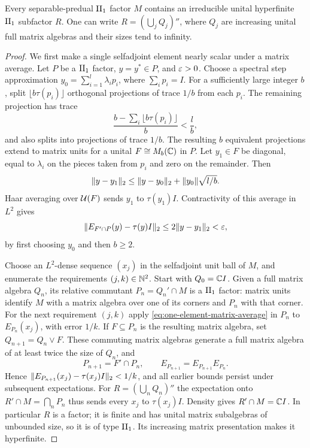 \begin{lemma}
\label{lem:irreducible-hyperfinite}
Every separable-predual $\mathrm{II}_1$ factor $M$ contains an irreducible unital
hyperfinite $\mathrm{II}_1$ subfactor $R$.  One can write
$R=(\bigcup_j Q_j)''$, where $Q_j$ are increasing unital full matrix
algebras and their sizes tend to infinity.
\end{lemma}
\begin{proof}
We first make a single selfadjoint element nearly scalar under a matrix
average.  Let $P$ be a $\mathrm{II}_1$ factor, $y=y^*\in P$, and $\varepsilon>0$.
Choose a spectral step approximation $y_0=\sum_{i=1}^l\lambda_i p_i$,
where $\sum_i p_i=I$.  For a sufficiently large integer $b$, split
$\lfloor b\tau(p_i)\rfloor$ orthogonal projections of trace $1/b$ from
each $p_i$.  The remaining projection has trace
\[
 \frac{b-\sum_i\lfloor b\tau(p_i)\rfloor}{b}<\frac lb,
\]
and also splits into projections of trace $1/b$.  The resulting $b$
equivalent projections extend to matrix units for a unital
$F\cong M_b(\mathbb C)$ in $P$.  Let $y_1\in F$ be diagonal, equal to
$\lambda_i$ on the pieces taken from $p_i$ and zero on the remainder.
Then
\[
 \lVert y-y_1\rVert_2\le\lVert y-y_0\rVert_2+\lVert y_0\rVert\sqrt{l/b}.
\]
Haar averaging over $\mathcal U(F)$ sends $y_1$ to $\tau(y_1)I$.  Contractivity
of this average in $L^2$ gives
\begin{equation}
 \lVert E_{F'\cap P}(y)-\tau(y)I\rVert_2
 \le2\lVert y-y_1\rVert_2<\varepsilon,
 \label{eq:one-element-matrix-average}
\end{equation}
by first choosing $y_0$ and then $b\ge2$.

Choose an $L^2$-dense sequence $(x_j)$ in the selfadjoint unit ball of
$M$, and enumerate the requirements $(j,k)\in\mathbb N^2$.  Start with
$Q_0=\mathbb C I$.  Given a full matrix algebra $Q_n$, its relative commutant
$P_n=Q_n'\cap M$ is a $\mathrm{II}_1$ factor: matrix units identify $M$ with a
matrix algebra over one of its corners and $P_n$ with that corner.
For the next requirement $(j,k)$ apply
\eqref{eq:one-element-matrix-average} in $P_n$ to $E_{P_n}(x_j)$, with
error $1/k$.  If $F\subseteq P_n$ is the resulting matrix algebra, set
$Q_{n+1}=Q_n\vee F$.  These commuting matrix algebras generate a full
matrix algebra of at least twice the size of $Q_n$, and
\[
 P_{n+1}=F'\cap P_n,\qquad E_{P_{n+1}}=E_{P_{n+1}}E_{P_n}.
\]
Hence $\lVert E_{P_{n+1}}(x_j)-\tau(x_j)I\rVert_2<1/k$, and all earlier
bounds persist under subsequent expectations.  For
$R=(\bigcup_nQ_n)''$ the expectation onto
$R'\cap M=\bigcap_nP_n$ thus sends every $x_j$ to $\tau(x_j)I$.
Density gives $R'\cap M=\mathbb C I$.  In particular $R$ is a factor; it is
finite and has unital matrix subalgebras of unbounded size, so it is of
type $\mathrm{II}_1$.  Its increasing matrix presentation makes it hyperfinite.
\end{proof}

